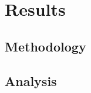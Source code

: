 \chapter{Results}
\vspace{-1.6em}
%

\minitoc%
\thispagestyle{empty}
\newpage

\section{Methodology}
\section{Analysis}
